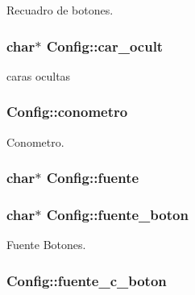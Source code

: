 Recuadro de botones. 

\hypertarget{class_config_1232c4b290f0ab28e04eec3b6ca702e3}{
\subsubsection[{car\_\-ocult}]{\setlength{\rightskip}{0pt plus 5cm}char$\ast$ {\bf Config::car\_\-ocult}}}
\label{class_config_1232c4b290f0ab28e04eec3b6ca702e3}


caras ocultas 

\hypertarget{class_config_221e1619fe58f93b4aa3369b6388ae76}{
\subsubsection[{conometro}]{ {\bf Config::conometro}}}
\label{class_config_221e1619fe58f93b4aa3369b6388ae76}


Conometro. 

\hypertarget{class_config_7346dfc8027f9d63ca5452fbb05dbfb5}{
\subsubsection[{fuente}]{\setlength{\rightskip}{0pt plus 5cm}char$\ast$ {\bf Config::fuente}}}
\label{class_config_7346dfc8027f9d63ca5452fbb05dbfb5}


\hypertarget{class_config_fb529bc47d1bf967f429261d57da7786}{
\subsubsection[{fuente\_\-boton}]{\setlength{\rightskip}{0pt plus 5cm}char$\ast$ {\bf Config::fuente\_\-boton}}}
\label{class_config_fb529bc47d1bf967f429261d57da7786}


Fuente Botones. 

\hypertarget{class_config_10426677e6f5a372ddf4bfea5da6f3d6}{
\subsubsection[{fuente\_\-c\_\-boton}]{ {\bf Config::fuente\_\-c\_\-boton}}}
\label{class_config_10426677e6f5a372ddf4bfea5da6f3d6}


